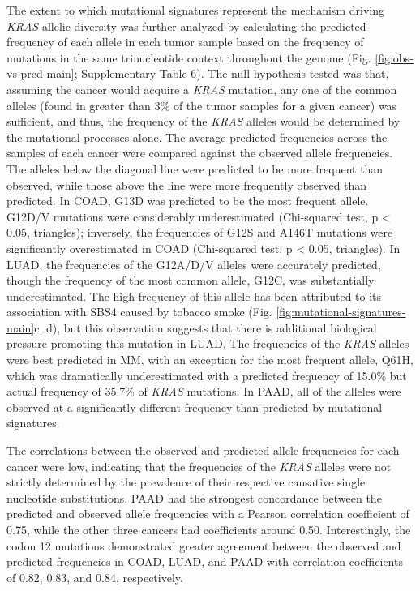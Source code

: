 \documentclass[english, 10pt, letterpaper]{article}
\newcommand{\KRAS}{\emph{KRAS}}
\begin{document}
The extent to which mutational signatures represent the mechanism driving \KRAS{} allelic diversity was further analyzed by calculating the predicted frequency of each allele in each tumor sample based on the frequency of mutations in the same trinucleotide context throughout the genome (Fig. \ref{fig:obs-vs-pred-main}; Supplementary Table 6).
The null hypothesis tested was that, assuming the cancer would acquire a \KRAS{} mutation, any one of the common alleles (found in greater than 3\% of the tumor samples for a given cancer) was sufficient, and thus, the frequency of the \KRAS{} alleles would be determined by the mutational processes alone.
The average predicted frequencies across the samples of each cancer were compared against the observed allele frequencies.
The alleles below the diagonal line were predicted to be more frequent than observed, while those above the line were more frequently observed than predicted.
In COAD, G13D was predicted to be the most frequent allele.
G12D/V mutations were considerably underestimated (Chi-squared test, p < 0.05, triangles); inversely, the frequencies of G12S and A146T mutations were significantly overestimated in COAD (Chi-squared test, p < 0.05, triangles).
In LUAD, the frequencies of the G12A/D/V alleles were accurately predicted, though the frequency of the most common allele, G12C, was substantially underestimated.
The high frequency of this allele has been attributed to its association with SBS4 caused by tobacco smoke (Fig. \ref{fig:mutational-signatures-main}c, d), but this observation suggests that there is additional biological pressure promoting this mutation in LUAD.
The frequencies of the \KRAS{} alleles were best predicted in MM, with an exception for the most frequent allele, Q61H, which was dramatically underestimated with a predicted frequency of 15.0\% but actual frequency of 35.7\% of \KRAS{} mutations.
In PAAD, all of the alleles were observed at a significantly different frequency than predicted by mutational signatures.

The correlations between the observed and predicted allele frequencies for each cancer were low, indicating that the frequencies of the \KRAS{} alleles were not strictly determined by the prevalence of their respective causative single nucleotide substitutions.
PAAD had the strongest concordance between the predicted and observed allele frequencies with a Pearson correlation coefficient of 0.75, while the other three cancers had coefficients around 0.50.
Interestingly, the codon 12 mutations demonstrated greater agreement between the observed and predicted frequencies in COAD, LUAD, and PAAD with correlation coefficients of 0.82, 0.83, and 0.84, respectively.
\end{document}
